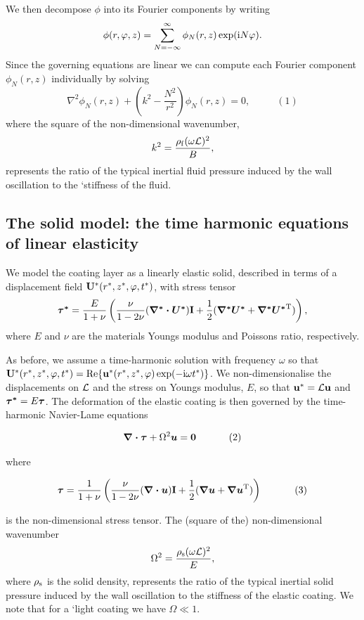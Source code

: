 We then decompose $ \phi $ into its Fourier components by writing \[ {\phi}(r,\varphi,z) = \sum_{N=-\infty}^{\infty} \phi_N(r,z) \exp({\rm i} N \varphi). \] Since the governing equations are linear we can compute each Fourier component $ \phi_N(r,z) $ individually by solving \[ \nabla^2 {\phi_{N}}(r,z) + \left(k^2-\frac{N^2}{r^2}\right) \phi_N(r,z) = 0, \ \ \ \ \ \ \ \ \ \ \ \ (1) \] where the square of the non-\/dimensional wavenumber, \[ k^2 = \frac{\rho_{\rm f} (\omega {\cal L})^2}{B}, \] represents the ratio of the typical inertial fluid pressure induced by the wall oscillation to the `stiffness\textquotesingle{} of the fluid.\hypertarget{index_elastic}{}\subsection{The solid model\+: the time harmonic equations of linear elasticity}\label{index_elastic}
We model the coating layer as a linearly elastic solid, described in terms of a displacement field $ {\bf U}^*(r^*,z^*,\varphi,t^*)$, with stress tensor \[ \mbox{\boldmath$ \tau^*$}=\frac{E}{1+\nu}\left( \frac{\nu}{1-2\nu}(\mbox{\boldmath$\nabla^*\cdot U^*$})\textbf{I}+ \frac{1}{2}(\mbox{\boldmath$ \nabla^* U^*$}+ \mbox{\boldmath$ \nabla^* U^*$}^{{\rm T}})\right), \] where $E$ and $\nu$ are the material\textquotesingle{}s Young\textquotesingle{}s modulus and Poisson\textquotesingle{}s ratio, respectively.

As before, we assume a time-\/harmonic solution with frequency $ \omega$ so that $ {\bf U}^*(r^*,z^*,\varphi,t^*) = {\rm Re} \{ {\bf u}^*(r^*,z^*,\varphi) \exp(-{\rm i}\omega t^*)\}$. We non-\/dimensionalise the displacements on ${\cal L}$ and the stress on Young\textquotesingle{}s modulus, $E$, so that ${\bf u}^* = {\cal L} {\bf u} $ and $ \mbox{\boldmath$ \tau^*$} = E \mbox{\boldmath$ \tau$}$. The deformation of the elastic coating is then governed by the time-\/harmonic Navier-\/\+Lame equations \begin{center} \[ \mbox{\boldmath$ \nabla\cdot\tau$}+\Omega^2\mbox{\boldmath$ u$} = {\bf 0} \ \ \ \ \ \ \ \ \ \ (2) \] \end{center}  where \begin{center} \[ \mbox{\boldmath$ \tau $}=\frac{1}{1+\nu}\left( \frac{\nu}{1-2\nu}(\mbox{\boldmath$\nabla\cdot u$})\textbf{I}+ \frac{1}{2}(\mbox{\boldmath$ \nabla u$}+\mbox{\boldmath$ \nabla u$}^{{\rm T}})\right) \ \ \ \ \ \ \ \ \ \ (3) \] \end{center}  is the non-\/dimensional stress tensor. The (square of the) non-\/dimensional wavenumber \[ \Omega^2 = \frac{\rho_{\rm s} (\omega {\cal L})^2}{E}, \] where $ \rho_{\rm s}$ is the solid density, represents the ratio of the typical inertial solid pressure induced by the wall oscillation to the stiffness of the elastic coating. We note that for a `light\textquotesingle{} coating we have $\Omega \ll 1$.

